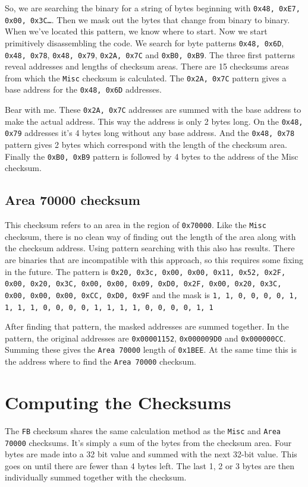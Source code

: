 \documentclass[11pt,a4paper]{book}
\begin{document}
So, we are searching the binary for a string of bytes beginning with \texttt{0x48, 0xE7,
0x00, 0x3C\ldots}. Then we mask out the bytes that change from binary to binary. When
we've located this pattern, we know where to start. Now we start primitively
disassembling the code. We search for byte patterns \texttt{0x48, 0x6D},
\texttt{0x48, 0x78}, \texttt{0x48, 0x79}, \texttt{0x2A, 0x7C} and \texttt{0xB0,
0xB9}. The three first patterns reveal addresses and lengths of checksum areas.
There are 15 checksums areas from which the \texttt{Misc} checksum is calculated. The
\texttt{0x2A, 0x7C} pattern gives a base address for the \texttt{0x48, 0x6D}
addresses.

Bear with me. These \texttt{0x2A, 0x7C} addresses are summed with the base
address to make the actual address. This way the address is only 2 bytes long.
On the \texttt{0x48, 0x79} addresses it's 4 bytes long without any base address.
And the \texttt{0x48, 0x78} pattern gives 2 bytes which correspond with the
length of the checksum area. Finally the \texttt{0xB0, 0xB9} pattern is followed
by 4 bytes to the address of the Misc checksum.

\subsection{Area 70000 checksum}
This checksum refers to an area in the region of
\texttt{0x70000}. Like the \texttt{Misc} checksum, there is no clean way of
finding out the length of the area along with the checksum address. Using
pattern searching with this also has results. There are binaries that are
incompatible with this approach, so this requires some fixing in the future. The
pattern is \texttt{0x20, 0x3c, 0x00, 0x00, 0x11, 0x52, 0x2F, 0x00, 0x20, 0x3C,
    0x00, 0x00, 0x09, 0xD0, 0x2F, 0x00, 0x20, 0x3C, 0x00, 0x00, 0x00, 0xCC,
0xD0, 0x9F} and the mask is \texttt{1, 1, 0, 0, 0, 0, 1, 1, 1, 1, 0, 0, 0, 0, 1,
1, 1, 1, 0, 0, 0, 0, 1, 1}

After finding that pattern, the masked addresses are summed together. In the
pattern, the original addresses are \texttt{0x00001152}, \texttt{0x000009D0} and
\texttt{0x000000CC}. Summing these gives the \texttt{Area 70000} length of
\texttt{0x1BEE}. At the same time this is the address where to find the \texttt{Area
70000} checksum.

\section{Computing the Checksums}
The \texttt{FB} checksum shares the same calculation method as the \texttt{Misc} and \texttt{Area
70000} checksums. It's simply a sum of the bytes from the checksum area. Four
bytes are made into a 32 bit value and summed with the next 32-bit value. This
goes on until there are fewer than 4 bytes left. The last 1, 2 or 3 bytes are
then individually summed together with the checksum.
\end{document}
